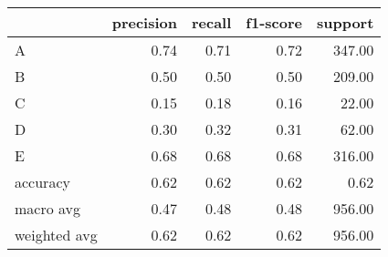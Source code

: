 \begin{tabular}{|l|r|r|r|r|}
\hline
{} &  precision &  recall &  f1-score &  support \\
\hline
A            &       0.74 &    0.71 &      0.72 &   347.00 \\
B            &       0.50 &    0.50 &      0.50 &   209.00 \\
C            &       0.15 &    0.18 &      0.16 &    22.00 \\
D            &       0.30 &    0.32 &      0.31 &    62.00 \\
E            &       0.68 &    0.68 &      0.68 &   316.00 \\
accuracy     &       0.62 &    0.62 &      0.62 &     0.62 \\
macro avg    &       0.47 &    0.48 &      0.48 &   956.00 \\
weighted avg &       0.62 &    0.62 &      0.62 &   956.00 \\
\hline
\end{tabular}
